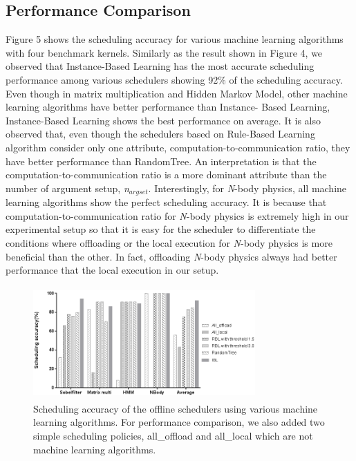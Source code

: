\documentclass[10pt, conference, compsocconf]{IEEEtran}
\begin{document}
\subsection{Performance Comparison}
%
Figure 5 shows the scheduling accuracy for various machine learning
algorithms with four benchmark kernels.
%
%
Similarly as the result shown in Figure 4, we observed that
Instance-Based Learning has the most accurate scheduling performance
among various schedulers showing 92\% of the scheduling accuracy.
%
Even though in matrix multiplication and Hidden Markov Model,
other machine learning algorithms have better performance than Instance-
Based Learning,
Instance-Based Learning shows the best performance on average.
%
It is also observed that, even though the schedulers based on Rule-Based
Learning algorithm consider only one attribute,
computation-to-communication ratio, they have better performance than
RandomTree.
%
An interpretation is that the computation-to-communication ratio is a
more dominant attribute than the number of argument setup, \textit{n$_{argset}$}.
%
Interestingly, for \textit{N}-body physics, all machine learning
algorithms show the perfect scheduling accuracy.
%
It is because that computation-to-communication ratio for
\textit{N}-body physics is extremely high in our experimental setup
so that it is easy for the scheduler to differentiate the conditions 
where offloading or the local execution for \textit{N}-body physics 
is more beneficial than the other.
%
In fact, offloading \textit{N}-body physics always had better
performance that the local execution in our setup.\\
%
%
\begin{figure}
\centering
\includegraphics[height=4.3cm, width=8.5cm]{Figure/figure5}
\caption{Scheduling accuracy of the offline schedulers using various
machine learning algorithms.
%
For performance comparison, we also added two simple scheduling policies,
all\_offload and all\_local which are not machine learning algorithms.}
\end{figure}
\end{document}

